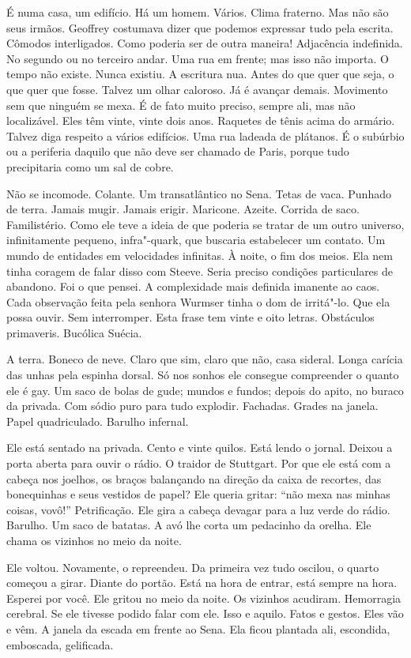 É numa casa, um edifício. Há um homem. Vários. Clima fraterno. Mas não
são seus irmãos. Geoffrey costumava dizer que podemos expressar tudo
pela escrita. Cômodos interligados. Como poderia ser de outra maneira!
Adjacência indefinida. No segundo ou no terceiro andar. Uma rua em
frente; mas isso não importa. O tempo não existe. Nunca existiu. A
escritura nua. Antes do que quer que seja, o que quer que fosse. Talvez
um olhar caloroso. Já é avançar demais. Movimento sem que ninguém se
mexa. É de fato muito preciso, sempre ali, mas não localizável. Eles têm
vinte, vinte dois anos. Raquetes de tênis acima do armário. Talvez diga
respeito a vários edifícios. Uma rua ladeada de plátanos. É o subúrbio
ou a periferia daquilo que não deve ser chamado de Paris, porque tudo
precipitaria como um sal de cobre.

Não se incomode. Colante. Um transatlântico no Sena. Tetas de vaca.
Punhado de terra. Jamais mugir. Jamais erigir. Maricone. Azeite. Corrida
de saco. Familistério. Como ele teve a ideia de que poderia se tratar de
um outro universo, infinitamente pequeno, infra"-quark, que buscaria
estabelecer um contato. Um mundo de entidades em velocidades infinitas.
À noite, o fim dos meios. Ela nem tinha coragem de falar disso com
Steeve. Seria preciso condições particulares de abandono. Foi o que
pensei. A complexidade mais definida imanente ao caos. Cada observação
feita pela senhora Wurmser tinha o dom de irritá"-lo. Que ela possa
ouvir. Sem interromper. Esta frase tem vinte e oito letras. Obstáculos
primaveris. Bucólica Suécia.

A terra. Boneco de neve. Claro que sim, claro que não, casa sideral.
Longa carícia das unhas pela espinha dorsal. Só nos sonhos ele consegue
compreender o quanto ele é gay. Um saco de bolas de gude; mundos e
fundos; depois do apito, no buraco da privada. Com sódio puro para tudo
explodir. Fachadas. Grades na janela. Papel quadriculado. Barulho
infernal.

Ele está sentado na privada. Cento e vinte quilos. Está lendo o jornal.
Deixou a porta aberta para ouvir o rádio. O traidor de Stuttgart. Por
que ele está com a cabeça nos joelhos, os braços balançando na direção
da caixa de recortes, das bonequinhas e seus vestidos de papel? Ele
queria gritar: ``não mexa nas minhas coisas, vovô!'' Petrificação. Ele %
gira a cabeça devagar para a luz verde do rádio. Barulho. Um saco de
batatas. A avó lhe corta um pedacinho da orelha. Ele chama os vizinhos
no meio da noite.

Ele voltou. Novamente, o repreendeu. Da primeira vez tudo oscilou, o
quarto começou a girar. Diante do portão. Está na hora de entrar, está
sempre na hora. Esperei por você. Ele gritou no meio da noite. Os
vizinhos acudiram. Hemorragia cerebral. Se ele tivesse podido falar com
ele. Isso e aquilo. Fatos e gestos. Eles vão e vêm. A janela da escada
em frente ao Sena. Ela ficou plantada ali, escondida, emboscada,
gelificada.

